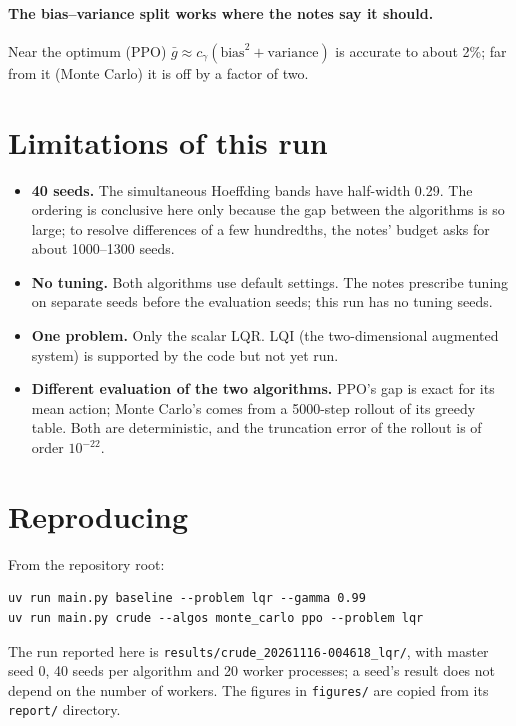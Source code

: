 \documentclass[11pt]{article}
\begin{document}
\paragraph{The bias--variance split works where the notes say it should.} Near the optimum (PPO)
$\bar g \approx c_\gamma(\text{bias}^2 + \text{variance})$ is accurate to about 2\%; far from it
(Monte Carlo) it is off by a factor of two.

\section{Limitations of this run}

\begin{itemize}[leftmargin=*]
  \item \textbf{40 seeds.} The simultaneous Hoeffding bands have half-width 0.29. The ordering is
    conclusive here only because the gap between the algorithms is so large; to resolve
    differences of a few hundredths, the notes' budget asks for about 1000--1300 seeds.
  \item \textbf{No tuning.} Both algorithms use default settings. The notes prescribe tuning on
    separate seeds before the evaluation seeds; this run has no tuning seeds.
  \item \textbf{One problem.} Only the scalar LQR. LQI (the two-dimensional augmented system) is
    supported by the code but not yet run.
  \item \textbf{Different evaluation of the two algorithms.} PPO's gap is exact for its mean
    action; Monte Carlo's comes from a 5000-step rollout of its greedy table. Both are
    deterministic, and the truncation error of the rollout is of order $10^{-22}$.
\end{itemize}

\section{Reproducing}

From the repository root:
\begin{verbatim}
uv run main.py baseline --problem lqr --gamma 0.99
uv run main.py crude --algos monte_carlo ppo --problem lqr
\end{verbatim}
The run reported here is \texttt{results/crude\_20261116-004618\_lqr/}, with master seed 0, 40 seeds
per algorithm and 20 worker processes; a seed's result does not depend on the number of workers.
The figures in \texttt{figures/} are copied from its \texttt{report/} directory.
\end{document}

